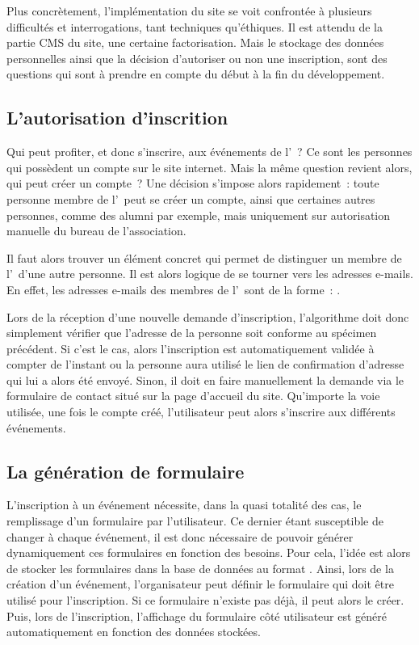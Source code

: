 Plus concrètement, l'implémentation du site se voit confrontée à plusieurs difficultés et interrogations, tant techniques qu'éthiques. Il est attendu de la partie CMS du site, une certaine factorisation. Mais le stockage des données personnelles ainsi que la décision d'autoriser ou non une inscription, sont des questions qui sont à prendre en compte du début à la fin du développement.

\subsection{L'autorisation d'inscrition}
\label{subsec:autorisation-inscription}

Qui peut profiter, et donc s'inscrire, aux événements de l'\ofni~? Ce sont les personnes qui possèdent un compte sur le site internet. Mais la même question revient alors, qui peut créer un compte~? Une décision s'impose alors rapidement~: toute personne membre de l'\univ\ peut se créer un compte, ainsi que certaines autres personnes, comme des alumni par exemple, mais uniquement sur autorisation manuelle du bureau de l'association.

Il faut alors trouver un élément concret qui permet de distinguer un membre de l'\univ\ d'une autre personne. Il est alors logique de se tourner vers les adresses e-mails. En effet, les adresses e-mails des membres de l'\univ\ sont de la forme~: .

Lors de la réception d'une nouvelle demande d'inscription, l'algorithme doit donc simplement vérifier que l'adresse  de la personne soit conforme au spécimen précédent. Si c'est le cas, alors l'inscription est automatiquement validée à compter de l'instant ou la personne aura utilisé le lien de confirmation d'adresse qui lui a alors été envoyé. Sinon, il doit en faire manuellement la demande via le formulaire de contact situé sur la page d'accueil du site. Qu'importe la voie utilisée, une fois le compte créé, l'utilisateur peut alors s'inscrire aux différents événements.

\subsection{La génération de formulaire}
\label{subsec:generation-formulaire}

L'inscription à un événement nécessite, dans la quasi totalité des cas, le remplissage d'un formulaire par l'utilisateur. Ce dernier étant susceptible de changer à chaque événement, il est donc nécessaire de pouvoir générer dynamiquement ces formulaires en fonction des besoins. Pour cela, l'idée est alors de stocker les formulaires dans la base de données au format . Ainsi, lors de la création d'un événement, l'organisateur peut définir le formulaire qui doit être utilisé pour l'inscription. Si ce formulaire n'existe pas déjà, il peut alors le créer. Puis, lors de l'inscription, l'affichage du formulaire côté utilisateur est généré automatiquement en fonction des données stockées.

